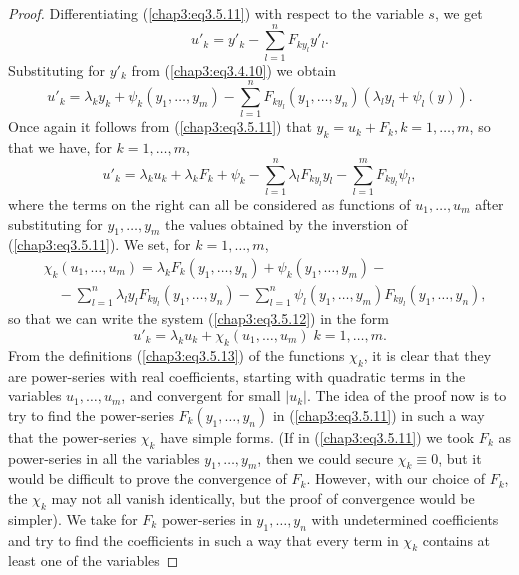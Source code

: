 \begin{proof}
Differentiating (\ref{chap3:eq3.5.11}) with respect to the variable
$s$, we get 
$$
u'_k = y'_k - \sum\limits^n_{l=1} F_{ky_l} y'_l.
$$
Substituting for $y'_k$ from (\ref{chap3:eq3.4.10}) we obtain
$$
u'_k = \lambda_k y_k + \psi_k(y_1, \ldots, y_m) - \sum\limits^n_{l=1}
F_{ky_l} (y_1, \ldots, y_n) (\lambda_l y_l + \psi_l (y)).  
$$
Once again it follows from (\ref{chap3:eq3.5.11}) that $y_k = u_k +
F_k, k =1, \ldots, m$, so that we have, for $k =1, \ldots, m$, 
\begin{equation*}
u'_k = \lambda_k u_k + \lambda_k F_k + \psi_k - \sum\limits^n_{l=1}
\lambda_l F_{ky_l} y_l - \sum\limits^m_{l=1} F_{ky_l} \psi_l,
\tag{3.5.12}\label{chap3:eq3.5.12} 
\end{equation*}\pageoriginale
where the terms on the right can all be considered as functions of
$u_1, \ldots, u_m$ after substituting for $y_1, \ldots, y_m$ the
values obtained by the inverstion of (\ref{chap3:eq3.5.11}). We set,
for $k = 1, \ldots,m$,  
\begin{align*}
& \chi_k (u_1, \ldots, u_m) = \lambda_k F_k (y_1, \ldots, y_n) +
  \psi_k (y_1,\ldots, y_m) - \\ 
& \quad - \sum\limits^n_{l=1} \lambda_l y_l F_{ky_l} (y_1, \ldots,
  y_n) - \sum\limits^{n}_{l=1} \psi_l (y_1, \ldots, y_m) F_{ky_l}
  (y_1, \ldots, y_n), \tag{3.5.13}\label{chap3:eq3.5.13} 
\end{align*}
so that we can write the system (\ref{chap3:eq3.5.12}) in the form 
\begin{equation*}
u'_k = \lambda_k u_k + \chi_k (u_1, \ldots, u_m) \; k =1 , \ldots,
m. \tag{3.5.14}\label{chap3:eq3.5.14} 
\end{equation*}
From the definitions (\ref{chap3:eq3.5.13}) of the functions $\chi_k$,
it is clear that they are power-series with real coefficients,
starting with quadratic terms in the variables $u_1, \ldots, u_m$, and
convergent for small $|u_k|$. The idea of the proof now is to try to
find the power-series $F_k (y_1, \ldots, y_n)$ in
(\ref{chap3:eq3.5.11}) in such a way that the power-series $\chi_k$
have simple forms. (If in (\ref{chap3:eq3.5.11}) we took $F_k$ as
power-series in all the variables $y_1, \ldots, y_m$, then we could
secure $\chi_k \equiv 0$, but it would be difficult to prove the
convergence of $F_k$. However, with our choice of $F_k$, the $\chi_k$
may not all vanish identically, but the proof of convergence would be
simpler). We take for $F_k$ power-series in $y_1, \ldots, y_n$ with
undetermined coefficients and try to find the coefficients in such a
way that every term in $\chi_k$ contains at least one of the variables

\end{proof}
